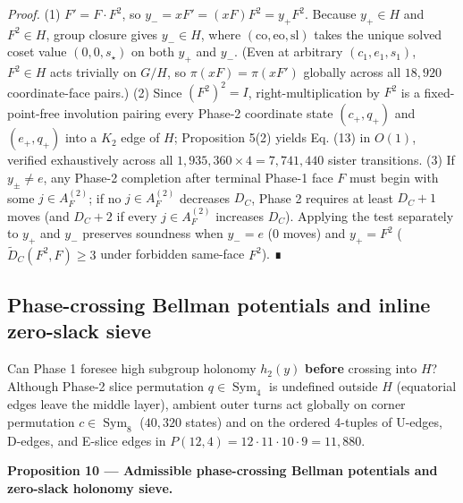 \documentclass[10pt,twocolumn,letterpaper]{article}
\begin{document}
\emph{Proof.} (1) \(F' = F \cdot F^2\), so
\(y_- = x F' = (x F) F^2 = y_+ F^2\). Because \(y_+ \in H\) and
\(F^2 \in H\), group closure gives \(y_- \in H\), where
\((\text{co}, \text{eo}, \text{sl})\) takes the unique solved coset
value \((0, 0, s_\star)\) on both \(y_+\) and \(y_-\). (Even at
arbitrary \((c_1, e_1, s_1)\), \(F^2 \in H\) acts trivially on \(G/H\),
so \(\pi(xF) = \pi(xF')\) globally across all \(18,920\) coordinate-face
pairs.) (2) Since \((F^2)^2 = I\), right-multiplication by \(F^2\) is a
fixed-point-free involution pairing every Phase-2 coordinate state
\((c_+, q_+)\) and \((e_+, q_+)\) into a \(K_2\) edge of \(H\);
Proposition 5(2) yields Eq. (13) in \(O(1)\), verified exhaustively
across all \(1,935,360 \times 4 = 7,741,440\) sister transitions. (3) If
\(y_\pm \ne e\), any Phase-2 completion after terminal Phase-1 face
\(F\) must begin with some \(j \in A_F^{(2)}\); if no
\(j \in A_F^{(2)}\) decreases \(D_C\), Phase 2 requires at least
\(D_C + 1\) moves (and \(D_C + 2\) if every \(j \in A_F^{(2)}\)
increases \(D_C\)). Applying the test separately to \(y_+\) and \(y_-\)
preserves soundness when \(y_- = e\) (\(0\) moves) and \(y_+ = F^2\)
(\(\tilde D_C(F^2, F) \ge 3\) under forbidden same-face \(F^2\)). ∎

\hypertarget{phase-crossing-bellman-potentials-and-inline-zero-slack-sieve}{%
\subsection{Phase-crossing Bellman potentials and inline zero-slack sieve}\label{phase-crossing-bellman-potentials-and-inline-zero-slack-sieve}}

Can Phase 1 foresee high subgroup holonomy \(h_2(y)\) \textbf{before}
crossing into \(H\)? Although Phase-2 slice permutation
\(q \in \operatorname{Sym}_4\) is undefined outside \(H\) (equatorial
edges leave the middle layer), ambient outer turns act globally on
corner permutation \(c \in \operatorname{Sym}_8\) (\(40,320\) states)
and on the ordered 4-tuples of U-edges, D-edges, and E-slice edges in
\(P(12, 4) = 12 \cdot 11 \cdot 10 \cdot 9 = 11,880\).

\textbf{Proposition 10 --- Admissible phase-crossing Bellman potentials
and zero-slack holonomy sieve.}
\end{document}
